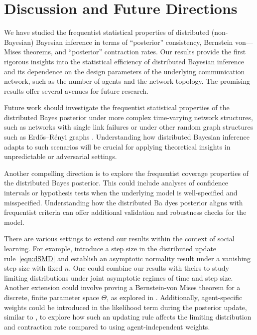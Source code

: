 \documentclass[twoside,11pt]{article}
\numberwithin{equation}{section}
\begin{document}
{\section{Discussion and Future Directions } \label{sect:discussion}
We have studied the frequentist statistical properties of distributed (non-Bayesian) Bayesian inference in terms of ``posterior'' consistency, Bernstein von—Mises theorems, and ``posterior'' contraction rates. Our results provide the first rigorous insights into the statistical efficiency of distributed Bayesian inference and its dependence on the design parameters of the underlying communication network, such as the number of agents and the network topology. The promising results offer several avenues for future research.


Future work should investigate the frequentist statistical properties of the distributed Bayes posterior under more complex time-varying network structures, such as networks with single link failures \citep{Shahrampour2015} or under other random graph structures such as Erdős–Rényi graphs \citep{erdHos1960evolution}. Understanding how distributed Bayesian inference adapts to such scenarios will be crucial for applying theoretical insights in unpredictable or adversarial settings.

Another compelling direction is to explore the frequentist coverage properties of the distributed Bayes posterior. This could include analyses of confidence intervals or hypothesis tests when the underlying model is well-specified and misspecified. Understanding how the distributed Ba dyes posterior aligns with frequentist criteria can offer additional validation and robustness checks for the model.


There are various settings to extend our results within the context of social learning. For example, \cite{Bordignon2021,Hu2023} introduce a step size in the distributed update rule~\eqref{eqn:dSMD} and establish an asymptotic normality result under a vanishing step size with fixed $n$. One could combine our results with theirs to study limiting distributions under joint asymptotic regimes of time and step size. Another extension could involve proving a Bernstein-von Mises theorem for a discrete, finite parameter space $\Theta$, as explored in \cite{Bordignon2021,Hu2023}. Additionally, agent-specific weights could be introduced in the likelihood term during the posterior update, similar to \cite{Bordignon2023}, to explore how such an updating rule affects the limiting distribution and contraction rate compared to using agent-independent weights.

}
\end{document}
